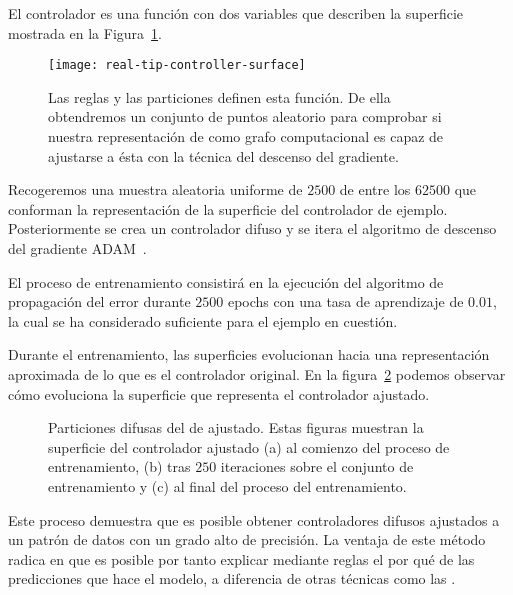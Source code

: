 El controlador es una función con dos variables que describen la superficie mostrada en la Figura~\ref{fig:real-tip-controller-surface}.

\begin{figure}[b]
	\centering
	\texttt{[image: real-tip-controller-surface]}
	\caption[Superficie de la función que modela el  de ejemplo]{Las reglas y las particiones definen esta función. De ella obtendremos un conjunto de puntos aleatorio para comprobar si nuestra representación de  como grafo computacional es capaz de ajustarse a ésta con la técnica del descenso del gradiente.}
	\label{fig:real-tip-controller-surface}
\end{figure}

Recogeremos una muestra aleatoria uniforme de $2500$ de entre los $62500$ que conforman la representación de la superficie del controlador de ejemplo. Posteriormente se crea un controlador difuso y se itera el algoritmo de descenso del gradiente ADAM~\cite{kingma2014adam}.

El proceso de entrenamiento consistirá en la ejecución del algoritmo de propagación del error durante $2500$ epochs con una tasa de aprendizaje de $0.01$, la cual se ha considerado suficiente para el ejemplo en cuestión.

Durante el entrenamiento, las superficies evolucionan hacia una representación aproximada de lo que es el controlador original. En la figura~\ref{fig:adjusted-tip-controller-training} podemos observar cómo evoluciona la superficie que representa el controlador ajustado.

\begin{figure}
	\centering
	\qquad
	\qquad
	\caption[Evolución del  de acuerdo al conjunto de datos extraido del ]{Particiones difusas del  de ajustado. Estas figuras muestran la superficie del controlador ajustado (a) al comienzo del proceso de entrenamiento, (b) tras $250$ iteraciones sobre el conjunto de entrenamiento y (c) al final del proceso del entrenamiento.}
	\label{fig:adjusted-tip-controller-training}
\end{figure}

Este proceso demuestra que es posible obtener controladores difusos ajustados a un patrón de datos con un grado alto de precisión. La ventaja de este método radica en que es posible por tanto explicar mediante reglas el por qué de las predicciones que hace el modelo, a diferencia de otras técnicas como las .